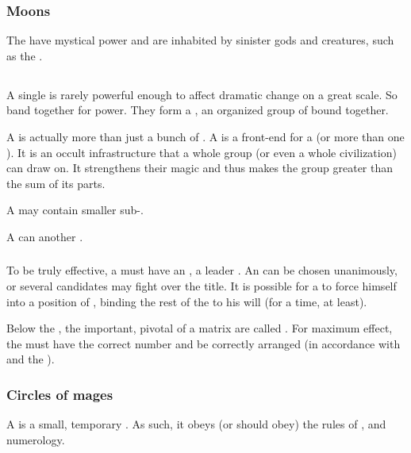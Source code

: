 \subsubsection{Moons}
The  have mystical power and are inhabited by sinister gods and creatures, such as the \moonwolves.









\subsection{\Matrix}
A single \vertex is rarely powerful enough to affect dramatic change on a great scale. 
So \vertices{} band together for power. 
They form a \matrixx, an organized group of \vertices{} bound together. 

A \matrix{} is actually more than just a bunch of \vertices. 
A \matrix{} is a front-end for a \dweomer{} (or more than one \dweomer). 
It is an occult infrastructure that a whole group (or even a whole civilization) can draw on. 
It strengthens their magic and thus makes the group greater than the sum of its parts. 

A \matrix{} may contain smaller sub-\matrices. 

A \matrixx{} can  another \matrixx. 





\subsubsection{\Apex}
\index{\apex}
To be truly effective, a \matrixx{} must have an \apex, a leader \vertex. An \apex{} can be chosen unanimously, or several candidates may fight over the title. It is possible for a \vertex{} to force himself into a position of \apex, binding the rest of the \matrixx{} to his will (for a time, at least). 

\index{\cardinalpoint}
Below the \apex, the important, pivotal \vertices{} of a matrix are called \cardinalpoints. 
For maximum effect, the \cardinalpoints must have the correct number and be correctly arranged (in accordance with  and the ). 





\subsubsection{Circles of mages}
A  is {a small, temporary \matrix}. 
As such, it obeys (or should obey) the rules of ,  and numerology. 





